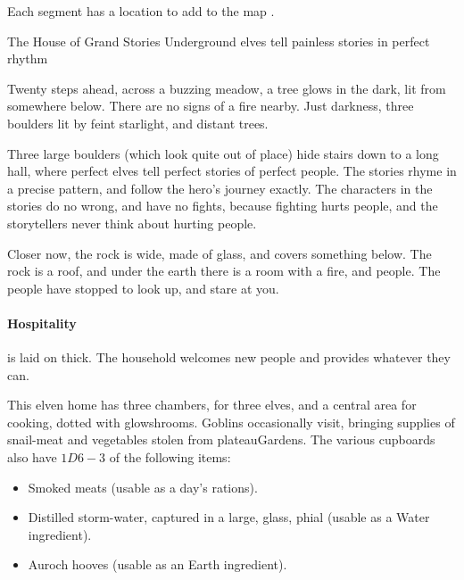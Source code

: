 
Each \gls{segment} has a location to add to the map .

{The House of Grand Stories}%
{Underground elves tell painless stories in perfect rhythm}%

\begin{boxtext}
  Twenty \glspl{step} ahead, across a buzzing meadow, a tree glows in the dark, lit from somewhere below.
  There are no signs of a fire nearby.
  Just darkness, three boulders lit by feint starlight, and distant trees.
\end{boxtext}

Three large boulders (which look quite out of place) hide stairs down to a long hall, where perfect elves tell perfect stories of perfect people.
The stories rhyme in a precise pattern, and follow the hero's journey exactly.
The characters in the stories do no wrong, and have no fights, because fighting hurts people, and the storytellers never think about hurting people.

\begin{boxtext}
  Closer now, the rock is  wide, made of glass, and covers something below.
  The rock is a roof, and under the earth there is a room with a fire, and people.
  The people have stopped to look up, and stare at you.
\end{boxtext}

\paragraph{Hospitality}
is laid on thick.
The household welcomes new people and provides whatever they can.

\label{ravencopsFireIngredients}
This elven home has three chambers, for three elves, and a central area for cooking, dotted with \glspl{glowshroom}.
Goblins occasionally visit, bringing supplies of snail-meat and vegetables stolen from \gls{plateauGardens}.
The various cupboards also have $1D6-3$ of the following items:

\begin{itemize}
  \item
  Smoked meats (usable as a day's \glspl{ration}).
  \item
  Distilled \gls{storm}-water, captured in a large, glass, phial (usable as a Water \gls{ingredient}).
  \item
  Auroch hooves (usable as an Earth \gls{ingredient}).
\end{itemize}

